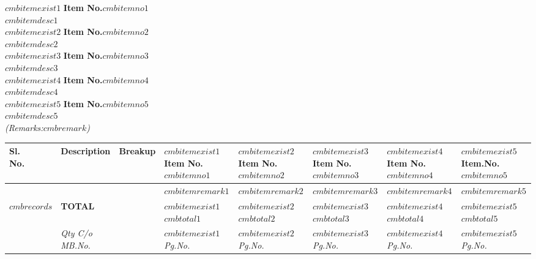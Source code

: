 
$cmbitemexist1$
\noindent\textbf{Item No.$cmbitemno1$}\\
\noindent $cmbitemdesc1$\\
\fi
$cmbitemexist2$
\noindent\textbf{Item No.$cmbitemno2$}\\
\noindent $cmbitemdesc2$\\
\fi
$cmbitemexist3$
\noindent\textbf{Item No.$cmbitemno3$}\\
\noindent $cmbitemdesc3$\\
\fi
$cmbitemexist4$
\noindent\textbf{Item No.$cmbitemno4$}\\
\noindent $cmbitemdesc4$\\
\fi
$cmbitemexist5$
\noindent\textbf{Item No.$cmbitemno5$}\\
\noindent $cmbitemdesc5$\\
\fi
\noindent\emph{(Remarks:$cmbremark$)}\\
\vspace*{-\baselineskip}
\begin{longtabu} to \textwidth {|X[1,c]|X[10,l]|X[5,l]|X[3,r]|X[3,r]|X[3,r]|X[3,r]|X[3,r]|}
   \hline
    \textbf{Sl.\newline No.} & \textbf{Description} & \textbf{Breakup} & $cmbitemexist1$\textbf{Item No.$cmbitemno1$}\fi & $cmbitemexist2$\textbf{Item No.$cmbitemno2$}\fi & $cmbitemexist3$\textbf{Item No.$cmbitemno3$}\fi & $cmbitemexist4$\textbf{Item No.$cmbitemno4$}\fi & $cmbitemexist5$\textbf{Item.No.$cmbitemno5$}\fi \\
   \hline
     &  &  & \emph{$cmbitemremark1$} & \emph{$cmbitemremark2$} & \emph{$cmbitemremark3$} & \emph{$cmbitemremark4$} & \emph{$cmbitemremark5$} \\
   \hline
    \endhead
$cmbrecords$
    \hline
      & \textbf{TOTAL} & & $cmbitemexist1$ \textbf{$cmbtotal1$} \fi & $cmbitemexist2$ \textbf{$cmbtotal2$} \fi & $cmbitemexist3$ \textbf{$cmbtotal3$} \fi & $cmbitemexist4$ \textbf{$cmbtotal4$} \fi & $cmbitemexist5$ \textbf{$cmbtotal5$} \fi \\
   \hline
      & \emph{Qty C/o MB.No. } &  & $cmbitemexist1$\emph{Pg.No. \pageref{$cmbcarriedover1$}} \label{$cmblabel1$}\fi & $cmbitemexist2$\emph{Pg.No. \pageref{$cmbcarriedover2$}} \label{$cmblabel2$}\fi & $cmbitemexist3$\emph{Pg.No. \pageref{$cmbcarriedover3$}} \label{$cmblabel3$} \fi & $cmbitemexist4$\emph{Pg.No. \pageref{$cmbcarriedover4$}} \label{$cmblabel4$} \fi & $cmbitemexist5$\emph{Pg.No. \pageref{$cmbcarriedover5$}} \label{$cmblabel5$}\fi \\
   \hline
\end{longtabu}

